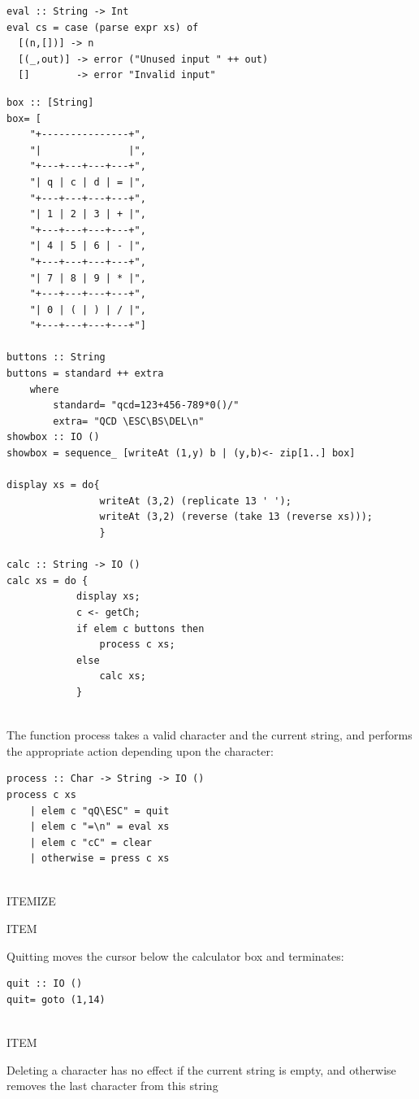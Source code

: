 \documentclass[a4papert]{article}
\begin{document}
\begin{lstlisting}[style=haskellstyle]
eval :: String -> Int
eval cs = case (parse expr xs) of
  [(n,[])] -> n
  [(_,out)] -> error ("Unused input " ++ out)
  []        -> error "Invalid input"
\end{lstlisting}
\begin{lstlisting}[style=haskellstyle]
box :: [String]
box= [
    "+---------------+",
    "|               |",
    "+---+---+---+---+",
    "| q | c | d | = |",
    "+---+---+---+---+",
    "| 1 | 2 | 3 | + |",
    "+---+---+---+---+",
    "| 4 | 5 | 6 | - |",
    "+---+---+---+---+",
    "| 7 | 8 | 9 | * |",
    "+---+---+---+---+",
    "| 0 | ( | ) | / |",
    "+---+---+---+---+"]

buttons :: String
buttons = standard ++ extra
    where
        standard= "qcd=123+456-789*0()/"
        extra= "QCD \ESC\BS\DEL\n"
showbox :: IO ()
showbox = sequence_ [writeAt (1,y) b | (y,b)<- zip[1..] box]

display xs = do{
                writeAt (3,2) (replicate 13 ' ');
                writeAt (3,2) (reverse (take 13 (reverse xs)));
                }

calc :: String -> IO ()
calc xs = do {
            display xs;
            c <- getCh;
            if elem c buttons then
                process c xs;
            else
                calc xs;
            }


\end{lstlisting}
The function process takes a valid character and the current string, and performs the appropriate action depending upon the character: 

\begin{lstlisting}[style=haskellstyle]
process :: Char -> String -> IO ()
process c xs
    | elem c "qQ\ESC" = quit
    | elem c "=\n" = eval xs
    | elem c "cC" = clear
    | otherwise = press c xs


\end{lstlisting}
ITEMIZE

ITEM

Quitting moves the cursor below the calculator box and terminates:

\begin{lstlisting}[style=haskellstyle]
quit :: IO ()
quit= goto (1,14)


\end{lstlisting}
ITEM

Deleting a character has no effect if the current string is empty, and otherwise removes the last character from this string
\end{document}
